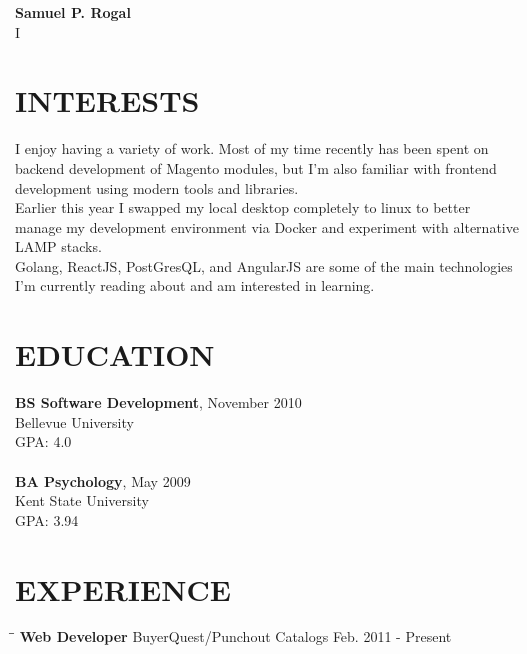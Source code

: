 \documentclass{res}
\begin{document}
 

{\huge \bf Samuel P. Rogal} \\
\colorbox{background-gray}{
	\color{background-gray}I
	\hspace{\linewidth}\hspace{-2\fboxsep}
}


\begin{flushleft}
 	\footnotesize 
\end{flushleft}
                                  
\begin{resume}

\section{INTERESTS}          
    I enjoy having a variety of work. Most of my time recently has been spent on backend
    development of Magento modules, but I'm also familiar with frontend development using
    modern tools and libraries. \\
    Earlier this year I swapped my local desktop completely to linux to better
    manage my development environment via Docker and experiment with alternative
    LAMP stacks. \\
    Golang, ReactJS, PostGresQL, and AngularJS are some of the main technologies I'm currently
    reading about and am interested in learning.
    
 
\section{EDUCATION}
    \textbf{BS Software Development}, November 2010 \\
    Bellevue University \\    
    GPA: 4.0 \\  
    \\
    \textbf{BA Psychology}, May 2009 \\
    Kent State University \\    
    GPA: 3.94
 
\section{EXPERIENCE}
   \vspace{-0.1in}	
   
   \begin{tabbing}
   		\hspace{2.0in}\= \hspace{2.7in}\= \kill %
    	\textbf{Web Developer} \>BuyerQuest/Punchout Catalogs     \>Feb. 2011 - Present\\
   \end{tabbing}\vspace{-20pt}      %
   

\end{resume}
\end{document}
